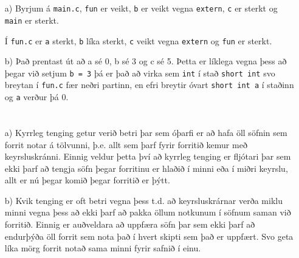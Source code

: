 \documentclass{article}
\begin{document}
	\section{}
	\begin{itemize}
		\item[a)] Byrjum á \texttt{main.c}, \texttt{fun} er veikt, 
			\texttt{b} er veikt vegna \texttt{extern}, \texttt{c} er sterkt 
			og \texttt{main} er sterkt.

			Í \texttt{fun.c} er \texttt{a} sterkt, \texttt{b} líka sterkt, 
			\texttt{c} veikt vegna \texttt{extern} og \texttt{fun} er sterkt.
		\item[b)] Það prentast út að a sé 0, b sé 3 og c sé 5. 
			Þetta er líklega vegna þess að þegar við setjum \texttt{b = 3} 
			þá er það að virka sem \texttt{int} í stað \texttt{short int} 
			svo breytan í \texttt{fun.c} fær neðri partinn, en efri 
			breytir óvart \texttt{short int a} í staðinn og \texttt{a} 
			verður þá $0$.
	\end{itemize}

	\section{}
	\begin{itemize}
		\item[a)] Kyrrleg tenging getur verið betri þar sem óþarfi er að 
			hafa öll söfnin sem forrit notar á tölvunni, þ.e. allt sem 
			þarf fyrir forritið kemur með keyrsluskránni. Einnig veldur 
			þetta því að kyrrleg tenging er fljótari þar sem ekki þarf að 
			tengja söfn þegar forritinu er hlaðið í minni eða í miðri 
			keyrslu, allt er nú þegar komið þegar forritið er þýtt.
		\item[b)] Kvik tenging er oft betri vegna þess t.d. að 
			keyrsluskrárnar verða miklu minni vegna þess að ekki þarf að 
			pakka öllum notkunum í söfnum saman við forritið. Einnig er 
			auðveldara að uppfæra söfn þar sem ekki þarf að endurþýða öll 
			forrit sem nota það í hvert skipti sem það er uppfært. Svo 
			geta líka mörg forrit notað sama minni fyrir safnið í einu.
	\end{itemize}
\end{document}
